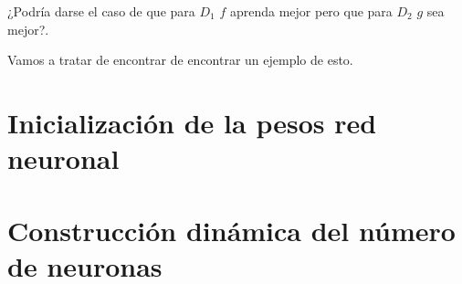 ¿Podría darse el caso de que para $D_1$ $f$ aprenda mejor pero que para $D_2$ $g$ sea mejor?. 


Vamos a tratar de encontrar de encontrar un ejemplo de esto.

\section{Inicialización de la pesos red neuronal}\label{hypothesis:pesos-iniciales}

\section{Construcción dinámica del número de neuronas}

